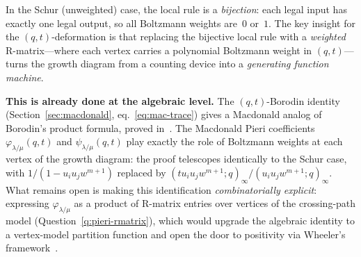 \documentclass[11pt]{article}
\theoremstyle{plain}
\theoremstyle{definition}
\theoremstyle{remark}
\begin{document}
\begin{enumerate}
  \smallskip
  In the Schur (unweighted) case, the local rule is a
  \emph{bijection}: each legal input has exactly one legal output,
  so all Boltzmann weights are~$0$ or~$1$.  The key insight for
  the $(q,t)$-deformation is that replacing the bijective local
  rule with a \emph{weighted} R-matrix---where each vertex
  carries a polynomial Boltzmann weight in $(q,t)$---turns the
  growth diagram from a counting device into a
  \emph{generating function machine}.

  \smallskip
  \textbf{This is already done at the algebraic level.}
  The $(q,t)$-Borodin identity
  (Section~\ref{sec:macdonald}, eq.~\eqref{eq:mac-trace})
  gives a Macdonald analog of Borodin's product formula,
  proved in~\cite{langer-thesis}.
  The Macdonald Pieri coefficients
  $\varphi_{\lambda/\mu}(q,t)$ and
  $\psi_{\lambda/\mu}(q,t)$
  play exactly the role of Boltzmann weights at each vertex of
  the growth diagram: the proof telescopes identically to the
  Schur case, with $1/(1 - u_iu_jw^{m+1})$ replaced by
  $(tu_iu_jw^{m+1};q)_\infty / (u_iu_jw^{m+1};q)_\infty$.
  What remains open is making this identification
  \emph{combinatorially explicit}: expressing $\varphi_{\lambda/\mu}$
  as a product of R-matrix entries over vertices of the crossing-path
  model (Question~\ref{q:pieri-rmatrix}),
  which would upgrade the algebraic identity to a
  vertex-model partition function and open the door to
  positivity via Wheeler's
  framework~\cite{wheeler-zinn-justin-2016,wheeler-zinn-justin-2016b,
  aggarwal-borodin-wheeler-2021}.
  
  \begin{center}
\end{center}
\end{enumerate}
\end{document}
